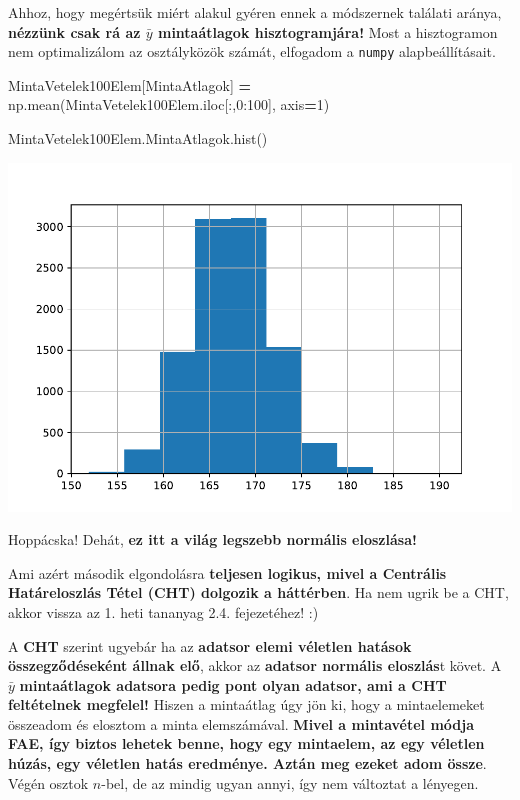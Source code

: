 \documentclass[
]{book}
\newenvironment{Shaded}{\begin{snugshade}}{\end{snugshade}}
\newcommand{\DecValTok}[1]{\textcolor[rgb]{0.00,0.00,0.81}{#1}}
\newcommand{\NormalTok}[1]{#1}
\newcommand{\OperatorTok}[1]{\textcolor[rgb]{0.81,0.36,0.00}{\textbf{#1}}}
\newcommand{\StringTok}[1]{\textcolor[rgb]{0.31,0.60,0.02}{#1}}
\begin{document}
Ahhoz, hogy megértsük miért alakul gyéren ennek a módszernek találati aránya, \textbf{nézzünk csak rá az \(\bar{y}\) mintaátlagok hisztogramjára!} Most a hisztogramon nem optimalizálom az osztályközök számát, elfogadom a \texttt{numpy} alapbeállításait.

\begin{Shaded}
\begin{Highlighting}[]
\NormalTok{MintaVetelek100Elem[}\StringTok{\textquotesingle{}MintaAtlagok\textquotesingle{}}\NormalTok{] }\OperatorTok{=}\NormalTok{ np.mean(MintaVetelek100Elem.iloc[:,}\DecValTok{0}\NormalTok{:}\DecValTok{100}\NormalTok{], axis}\OperatorTok{=}\DecValTok{1}\NormalTok{)}

\NormalTok{MintaVetelek100Elem.MintaAtlagok.hist()}
\end{Highlighting}
\end{Shaded}

\includegraphics{_main_files/figure-latex/unnamed-chunk-259-5.pdf}

Hoppácska! Dehát, \textbf{ez itt a világ legszebb normális eloszlása!}

Ami azért második elgondolásra \textbf{teljesen logikus, mivel a Centrális Határeloszlás Tétel (CHT) dolgozik a háttérben}. Ha nem ugrik be a CHT, akkor vissza az 1. heti tananyag 2.4. fejezetéhez! :)

A \textbf{CHT} szerint ugyebár ha az \textbf{adatsor elemi véletlen hatások összegződéseként állnak elő}, akkor az \textbf{adatsor normális eloszlás}t követ. A \(\bar{y}\) \textbf{mintaátlagok adatsora pedig pont olyan adatsor, ami a CHT feltételnek megfelel!} Hiszen a mintaátlag úgy jön ki, hogy a mintaelemeket összeadom és elosztom a minta elemszámával. \textbf{Mivel a mintavétel módja FAE, így biztos lehetek benne, hogy egy mintaelem, az egy véletlen húzás, egy véletlen hatás eredménye. Aztán meg ezeket adom össze}. Végén osztok \(n\)-bel, de az mindig ugyan annyi, így nem változtat a lényegen.
\end{document}

